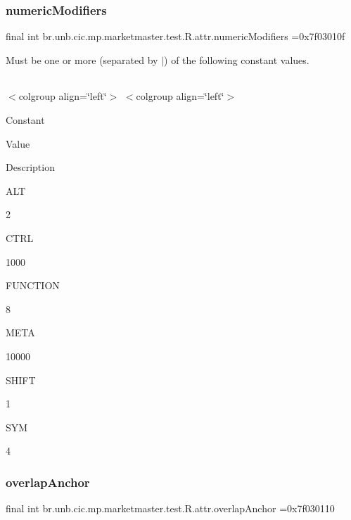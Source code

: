 \subsubsection{\texorpdfstring{numeric\+Modifiers}{numericModifiers}}
{\footnotesize\ttfamily final int br.\+unb.\+cic.\+mp.\+marketmaster.\+test.\+R.\+attr.\+numeric\+Modifiers =0x7f03010f\hspace{0.3cm}{\ttfamily [static]}}

Must be one or more (separated by \textquotesingle{}$\vert$\textquotesingle{}) of the following constant values.

\tabulinesep=1mm
\begin{longtabu} spread 0pt [c]{*{0}{|X[-1]}|}
\hline
\end{longtabu}
$<$colgroup align=\char`\"{}left\char`\"{}$>$ $<$colgroup align=\char`\"{}left\char`\"{}$>$ 

Constant

Value

Description 

A\+LT

2

C\+T\+RL

1000

F\+U\+N\+C\+T\+I\+ON

8

M\+E\+TA

10000

S\+H\+I\+FT

1

S\+YM

4\mbox{\label{classbr_1_1unb_1_1cic_1_1mp_1_1marketmaster_1_1test_1_1R_1_1attr_ac0f58a5bb2f4a18631d3b22633bf416c}} 
\subsubsection{\texorpdfstring{overlap\+Anchor}{overlapAnchor}}
{\footnotesize\ttfamily final int br.\+unb.\+cic.\+mp.\+marketmaster.\+test.\+R.\+attr.\+overlap\+Anchor =0x7f030110\hspace{0.3cm}{\ttfamily [static]}}

